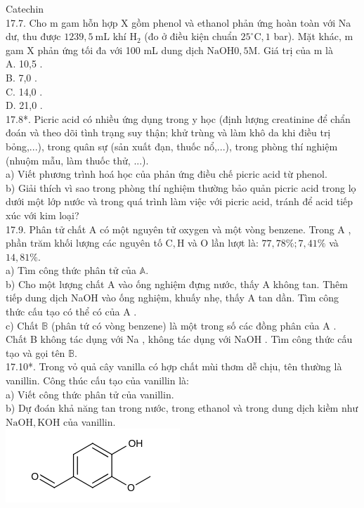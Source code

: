\documentclass[10pt]{article}
\begin{document}
Catechin\\
17.7. Cho m gam hỗn hợp X gồm phenol và ethanol phản ứng hoàn toàn với Na dư, thu được $1239,5 \mathrm{~mL}$ khí $\mathrm{H}_{2}$ (đo ở điều kiện chuẩn $25^{\circ} \mathrm{C}, 1$ bar). Mặt khác, m gam X phản ứng tối đa với 100 mL dung dịch $\mathrm{NaOH} 0,5 \mathrm{M}$. Giá trị của m là\\
A. 10,5 .\\
B. 7,0 .\\
C. 14,0 .\\
D. 21,0 .\\
17.8*. Picric acid có nhiều ứng dụng trong y học (định lượng creatinine để chẩn đoán và theo dõi tình trạng suy thận; khử trùng và làm khô da khi điều trị bỏng,...), trong quân sự (sản xuất đạn, thuốc nổ,...), trong phòng thí nghiệm (nhuộm mẫu, làm thuốc thử, ...).\\
a) Viết phương trình hoá học của phản ứng điều chế picric acid từ phenol.\\
b) Giải thích vì sao trong phòng thí nghiệm thường bảo quản picric acid trong lọ dưới một lớp nước và trong quá trình làm việc với picric acid, tránh để acid tiếp xúc với kim loại?\\
17.9. Phân tử chất A có một nguyên tử oxygen và một vòng benzene. Trong A , phần trăm khối lượng các nguyên tố $\mathrm{C}, \mathrm{H}$ và O lần lượt là: $77,78 \% ; 7,41 \%$ và $14,81 \%$.\\
a) Tìm công thức phân tử của $\mathbb{A}$.\\
b) Cho một lượng chất A vào ống nghiệm đựng nước, thấy A không tan. Thêm tiếp dung dịch NaOH vào ống nghiệm, khuấy nhẹ, thấy A tan dần. Tìm công thức cấu tạo có thể có của A .\\
c) Chất $\mathbb{B}$ (phân tứ có vòng benzene) là một trong số các đồng phân của A . Chất B không tác dụng với Na , không tác dụng với NaOH . Tìm công thức cấu tạo và gọi tên $\mathbb{B}$.\\
17.10*. Trong vỏ quả cây vanilla có hợp chất mùi thơm dễ chịu, tên thường là vanillin. Công thúc cấu tạo của vanillin là:\\
a) Viết công thức phân tử của vanillin.\\
b) Dự đoán khả năng tan trong nước, trong ethanol và trong dung dịch kiềm như $\mathrm{NaOH}, \mathrm{KOH}$ của vanillin.\\
\includegraphics{smile-1e9d767a987d163ebc2a73cdf82e4456aa78a71f}
\end{document}
